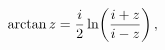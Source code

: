 \[\mathop{\mathrm{arctan}\/}\nolimits z=\frac{i}{2}\mathop{\ln\/}\nolimits\!%
\left(\frac{i+z}{i-z}\right),\]